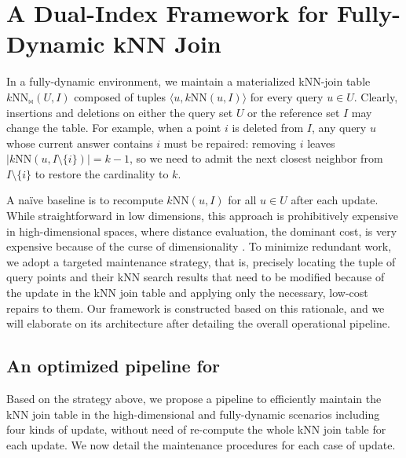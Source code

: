 \section{A Dual-Index Framework for Fully-Dynamic kNN Join}
\label{sec:framework}

In a fully-dynamic environment, we maintain a materialized kNN-join table $k\mathrm{NN}_{\bowtie}(U,I)$ composed of tuples $\langle u, k\mathrm{NN}(u,I)\rangle$ for every query $u\in U$. Clearly, insertions and deletions on either the query set $U$ or the reference set $I$ may change the table. For example, when a point $i$ is deleted from $I$, any query $u$ whose current answer contains $i$ must be repaired: removing $i$ leaves $|k\mathrm{NN}(u,I\setminus\{i\})|=k-1$, so we need to admit the next closest neighbor from $I\setminus\{i\}$ to restore the cardinality to $k$.

A naïve baseline is to recompute $k\mathrm{NN}(u,I)$ for all $u\in U$ after each update. While straightforward in low dimensions, this approach is prohibitively expensive in high-dimensional spaces, where distance evaluation, the dominant cost, is very expensive because of the curse of dimensionality \cite{altman2018curse}. To minimize redundant work, we adopt a targeted maintenance strategy, that is, precisely locating the tuple of query points and their kNN search results that need to be modified because of the update in the kNN join table and applying only the necessary, low-cost repairs to them. Our \dualtree framework is constructed based on this rationale, and we will elaborate on its architecture after detailing the overall operational pipeline.

\subsection{An optimized pipeline for \fdknnj}
\label{subsec:pipeline}
Based on the strategy above, we propose a pipeline to efficiently maintain the kNN join table in the high-dimensional and fully-dynamic scenarios including four kinds of update, without need of re-compute the whole kNN join table for each update. We now detail the maintenance procedures for each case of update.

